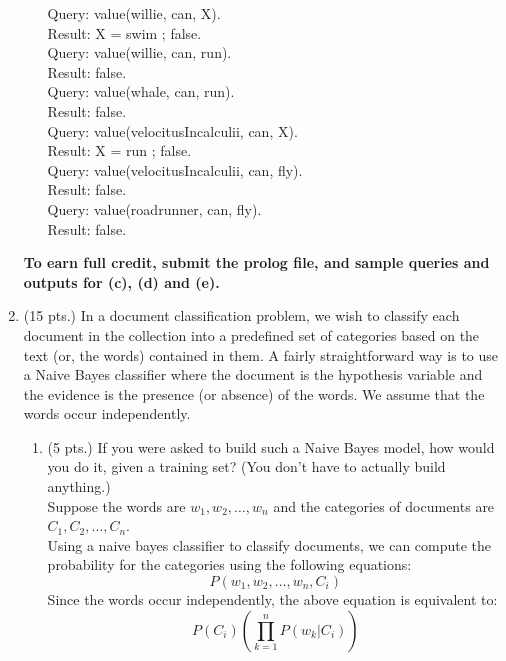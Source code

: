\documentclass{article}%
\begin{document}
\begin{enumerate}
\begin{enumerate}
		Query: value(willie, can, X). \\
		Result: X = swim ; false. \\
		
		Query: value(willie, can, run). \\
		Result: false. \\
		 
		Query: value(whale, can, run). \\
		Result: false. \\
		
		Query: value(velocitusIncalculii, can, X). \\
		Result: X = run ; false. \\
		
		Query: value(velocitusIncalculii, can, fly). \\
		Result: false. \\
		
		Query: value(roadrunner, can, fly). \\
		Result: false. \\
		
		
\end{enumerate}

\textbf{To earn full credit, submit the prolog file, and sample queries and outputs for (c), (d) and (e).}

\item (15 pts.) In a document classification problem, we wish to classify each document in the collection into a predefined set of categories based on the text (or, the words) contained in them. A fairly straightforward way is to use a Naive Bayes classifier where the document is the hypothesis variable and the evidence is the presence (or absence) of the words. We assume that the words occur independently.
	\begin{enumerate}
  		\item (5 pts.) If you were asked to build such a Naive Bayes model, how would you do it, given a training set? (You don't have to actually build anything.)\\
  		
  		Suppose the words are $w_1, w_2, \ldots, w_n$ and the categories of documents are $C_1, C_2, \ldots, C_n$.\\
  		Using a naive bayes classifier to classify documents, we can compute the probability for the categories using the following equations:
  		\begin{equation} P(w_1, w_2, \ldots, w_n, C_i) \end{equation}
  		Since the words occur independently, the above equation is equivalent to:
  		\begin{equation} P(C_i) ( \prod_{k=1}^{n}P(w_k|C_i)) \end{equation}
  		

\end{enumerate}
\end{enumerate}
\end{document}
